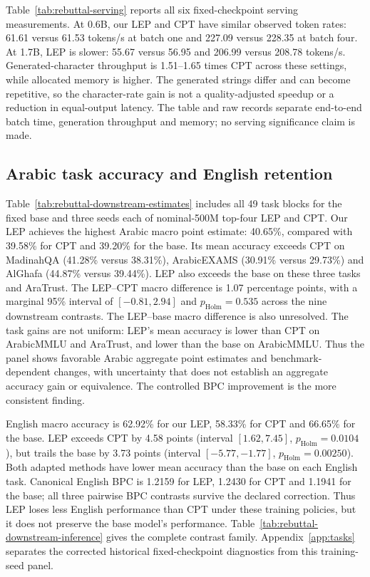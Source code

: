 \documentclass{ieeeaccess}
\begin{document}
Table~\ref{tab:rebuttal-serving} reports all six fixed-checkpoint serving
measurements. At 0.6B, our LEP and CPT have similar observed token rates:
61.61 versus 61.53 tokens/s at batch one and 227.09 versus 228.35 at
batch four. At 1.7B, LEP is slower: 55.67 versus 56.95 and 206.99 versus
208.78 tokens/s. Generated-character throughput is 1.51--1.65 times CPT
across these settings, while allocated memory is higher. The generated
strings differ and can become repetitive, so the character-rate gain
is not a quality-adjusted speedup or a reduction in equal-output latency.
The table and raw records separate end-to-end batch time, generation
throughput and memory; no serving significance claim is made.




\subsection{Arabic task accuracy and English retention}
\label{sec:res_tasks}

Table~\ref{tab:rebuttal-downstream-estimates} includes all 49 task blocks
for the fixed base and three seeds each of nominal-500M top-four LEP and
CPT. Our LEP achieves the highest Arabic macro point estimate: 40.65\%,
compared with 39.58\% for CPT and 39.20\% for the base. Its mean accuracy
exceeds CPT on MadinahQA (41.28\% versus 38.31\%), ArabicEXAMS
(30.91\% versus 29.73\%) and AlGhafa (44.87\% versus 39.44\%).
LEP also exceeds the base on these three tasks and AraTrust.
The LEP--CPT macro difference is 1.07 percentage
points, with a marginal 95\% interval of $[-0.81,2.94]$ and
$p_{\mathrm{Holm}}=0.535$ across the nine downstream contrasts.
The LEP--base macro difference is also unresolved. The task gains are not
uniform: LEP's mean accuracy is lower than CPT on ArabicMMLU and AraTrust,
and lower than the base on ArabicMMLU. Thus the panel shows favorable
Arabic aggregate point estimates and benchmark-dependent changes, with
uncertainty that does not establish an aggregate accuracy gain or
equivalence. The controlled BPC improvement is the more consistent finding.

English macro accuracy is 62.92\% for our LEP, 58.33\% for CPT and 66.65\%
for the base. LEP exceeds CPT by 4.58 points (interval $[1.62,7.45]$,
$p_{\mathrm{Holm}}=0.0104$), but trails the base by 3.73 points
(interval $[-5.77,-1.77]$, $p_{\mathrm{Holm}}=0.00250$).
Both adapted methods have lower mean accuracy than the base on each
English task. Canonical English BPC is 1.2159 for LEP, 1.2430 for CPT and
1.1941 for the base; all three pairwise BPC contrasts survive the declared
correction. Thus LEP loses less English performance than CPT under these
training policies, but it does not preserve the base model's performance.
Table~\ref{tab:rebuttal-downstream-inference} gives the complete contrast
family. Appendix~\ref{app:tasks} separates the corrected historical
fixed-checkpoint diagnostics from this training-seed panel.
\end{document}
